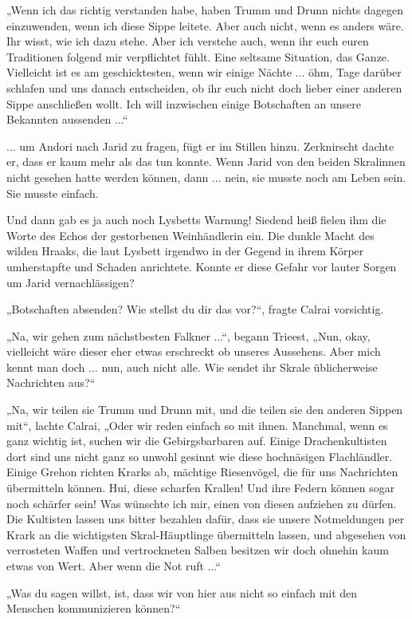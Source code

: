 „Wenn ich das richtig verstanden habe, haben Trumm und Drunn nichts dagegen einzuwenden, wenn ich diese Sippe leitete. Aber auch nicht, wenn es anders wäre. Ihr wisst, wie ich dazu stehe. Aber ich verstehe auch, wenn ihr euch euren Traditionen folgend mir verpflichtet fühlt. Eine seltsame Situation, das Ganze. Vielleicht ist es am geschicktesten, wenn wir einige Nächte ... öhm, Tage darüber schlafen und uns danach entscheiden, ob ihr euch nicht doch lieber einer anderen Sippe anschließen wollt. Ich will inzwischen einige Botschaften an unsere Bekannten aussenden ...“

... um Andori nach Jarid zu fragen, fügt er im Stillen hinzu. Zerknirscht dachte er, dass er kaum mehr als das tun konnte. Wenn Jarid von den beiden Skralinnen nicht gesehen hatte werden können, dann ... nein, sie musste noch am Leben sein. Sie musste einfach.

Und dann gab es ja auch noch Lysbetts Warnung! Siedend heiß fielen ihm die Worte des Echos der gestorbenen Weinhändlerin ein. Die dunkle Macht des wilden Hraaks, die laut Lysbett irgendwo in der Gegend in ihrem Körper umherstapfte und Schaden anrichtete. Konnte er diese Gefahr vor lauter Sorgen um Jarid vernachlässigen?

„Botschaften absenden? Wie stellst du dir das vor?“, fragte Calrai vorsichtig.

„Na, wir gehen zum nächstbesten Falkner ...“, begann Trieest, „Nun, okay, vielleicht wäre dieser eher etwas erschreckt ob unseres Aussehens. Aber mich kennt man doch ... nun, auch nicht alle. Wie sendet ihr Skrale üblicherweise Nachrichten aus?“

„Na, wir teilen sie Trumm und Drunn mit, und die teilen sie den anderen Sippen mit“, lachte Calrai, „Oder wir reden einfach so mit ihnen. Manchmal, wenn es ganz wichtig ist, suchen wir die Gebirgsbarbaren auf. Einige Drachenkultisten dort sind uns nicht ganz so unwohl gesinnt wie diese hochnäsigen Flachländler. Einige Grehon richten Krarks ab, mächtige Riesenvögel, die für uns Nachrichten übermitteln können. Hui, diese scharfen Krallen! Und ihre Federn können sogar noch schärfer sein! Was wünschte ich mir, einen von diesen aufziehen zu dürfen. Die Kultisten lassen uns bitter bezahlen dafür, dass sie unsere Notmeldungen per Krark an die wichtigsten Skral-Häuptlinge übermitteln lassen, und abgesehen von verrosteten Waffen und vertrockneten Salben besitzen wir doch ohnehin kaum etwas von Wert. Aber wenn die Not ruft ...“

„Was du sagen willst, ist, dass wir von hier aus nicht so einfach mit den Menschen kommunizieren können?“

